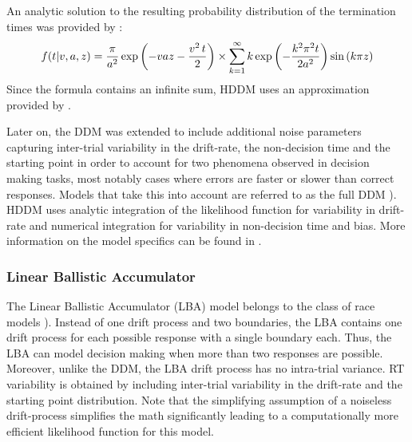 \documentclass[letterpaper,10pt,english]{sphinxmanual}
\begin{document}
An analytic solution to the resulting probability distribution of
the termination times was provided by \citep{Feller68}:
\begin{gather}
\begin{split}f(t|v, a, z) = \frac{\pi}{a^2} \, \text{exp} \left( -vaz-\frac{v^2\,t}{2} \right) \times \sum_{k=1}^{\infty} k\, \text{exp} \left( -\frac{k^2\pi^2 t}{2a^2} \right) \text{sin}\left(k\pi z\right)\end{split}\notag
\end{gather}
Since the formula contains an infinite sum, HDDM uses an approximation
provided by \citep{NavarroFuss09}.

Later on, the DDM was extended to include additional noise parameters
capturing inter-trial variability in the drift-rate, the non-decision
time and the starting point in order to account for two phenomena
observed in decision making tasks, most notably cases where errors are
faster or slower than correct responses. Models that take this into
account are referred to as the full DDM
\citep{RatcliffRouder98}). HDDM uses analytic integration of the
likelihood function for variability in drift-rate and numerical
integration for variability in non-decision time and bias. More
information on the model specifics can be found in \citep{SoferWieckiFrank}.


\subsubsection{Linear Ballistic Accumulator}
\label{methods:linear-ballistic-accumulator}
The Linear Ballistic Accumulator (LBA) model belongs to the class of
race models \citep{BrownHeathcote08}). Instead of one drift process
and two boundaries, the LBA contains one drift process for each
possible response with a single boundary each. Thus, the LBA can model
decision making when more than two responses are possible. Moreover,
unlike the DDM, the LBA drift process has no intra-trial variance. RT
variability is obtained by including inter-trial variability in the
drift-rate and the starting point distribution. Note that the
simplifying assumption of a noiseless drift-process simplifies the
math significantly leading to a computationally more efficient
likelihood function for this model.
\end{document}
